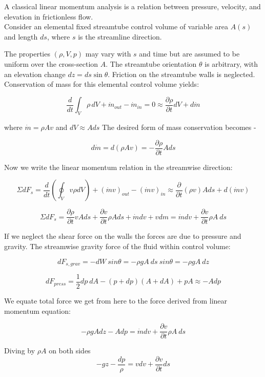 \documentclass{report}
\begin{document}
A classical linear momentum analysis is a relation between pressure, velocity, and elevation in frictionless flow.\\

Consider an elemental fixed streamtube control volume of variable area \( A(s) \) and length \( ds \), where \( s \) is the streamline direction.

The properties \( (\rho, V, p) \) may vary with \( s \) and time but are assumed to be uniform over the cross-section \( A \).
The streamtube orientation \( \theta \) is arbitrary, with an elevation change \( dz = ds \sin\theta \). Friction on the streamtube walls is neglected.\\

Conservation of mass for this elemental control volume yields:

\[ \frac{d}{dt} \int_V \rho \,dV + \dot{m}_{out} - \dot{m}_{in} = 0  \approx \frac{\partial\rho}{\partial t}dV + d \dot{m} \]

where \( \dot{m} = \rho Av\) and \( dV \approx A ds\) The desired form of mass conservation becomes - 

\[ d \dot{m} = d(\rho Av) = -\frac{\partial \rho}{\partial t}A ds\]

Now we write the linear momentum relation in the streamwise direction:

\[ \Sigma dF_s = \frac{d}{dt}(\oint_V v\rho dV) + (\dot{m}v)_{out} - (\dot{m}v)_{in} \approx \frac{\partial}{\partial t}(\rho v) A ds + d(\dot{m}v) \]

\[ \Sigma dF_s = \frac{\partial \rho}{\partial t}vAds + \frac{\partial v}{\partial t} \rho A ds + \dot{m}dv + vdm = \dot{m}dv + \frac{\partial v}{\partial t} \rho A \ ds\]


If we neglect the shear force on the walls the forces are due to pressure and gravity.
The streamwise gravity force of the fluid within control volume:

\[ dF_{s,grav} = -dW \ sin \theta = -\rho g A \ ds \ sin\theta = - \rho g A \ dz\]

\[ dF_{press} = \frac{1}{2} dp \ dA - (p+dp)(A+dA) + pA \approx -Adp\]

We equate total force we get from here to the force derived from linear momentum equation:

\[-\rho g A dz - A dp = \dot{m}dv + \frac{\partial v}{\partial t} \rho A \ ds\]

Diving by \(\rho A\) on both sides
\[ -gz - \frac{dp}{\rho} = vdv + \frac{\partial v}{\partial t} ds\]
\end{document}
